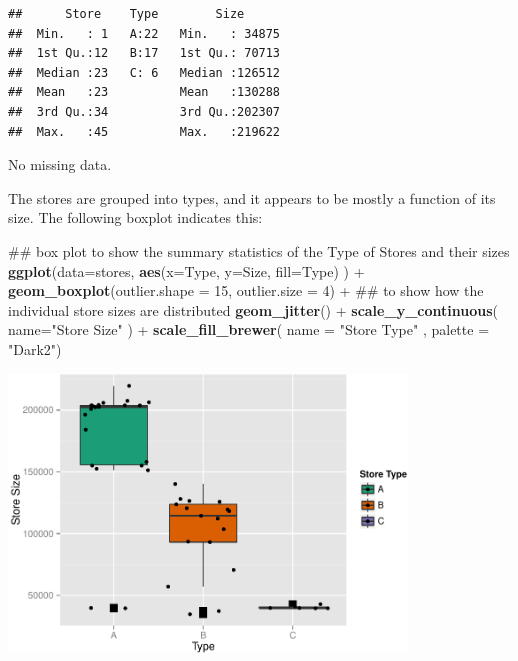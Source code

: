 \documentclass[]{article}
\newenvironment{Shaded}{\begin{snugshade}}{\end{snugshade}}
\newcommand{\KeywordTok}[1]{\textcolor[rgb]{0.13,0.29,0.53}{\textbf{{#1}}}}
\newcommand{\DataTypeTok}[1]{\textcolor[rgb]{0.13,0.29,0.53}{{#1}}}
\newcommand{\DecValTok}[1]{\textcolor[rgb]{0.00,0.00,0.81}{{#1}}}
\newcommand{\StringTok}[1]{\textcolor[rgb]{0.31,0.60,0.02}{{#1}}}
\newcommand{\NormalTok}[1]{{#1}}
\begin{document}
\begin{verbatim}
##      Store    Type        Size       
##  Min.   : 1   A:22   Min.   : 34875  
##  1st Qu.:12   B:17   1st Qu.: 70713  
##  Median :23   C: 6   Median :126512  
##  Mean   :23          Mean   :130288  
##  3rd Qu.:34          3rd Qu.:202307  
##  Max.   :45          Max.   :219622
\end{verbatim}

No missing data.

The stores are grouped into types, and it appears to be mostly a
function of its size. The following boxplot indicates this:

\begin{Shaded}
\begin{Highlighting}[]
\NormalTok{## box plot to show the summary statistics of the Type of Stores and their sizes}
\KeywordTok{ggplot}\NormalTok{(}\DataTypeTok{data=}\NormalTok{stores, }
       \KeywordTok{aes}\NormalTok{(}\DataTypeTok{x=}\NormalTok{Type, }\DataTypeTok{y=}\NormalTok{Size, }\DataTypeTok{fill=}\NormalTok{Type) ) +}\StringTok{ }
\StringTok{  }\KeywordTok{geom_boxplot}\NormalTok{(}\DataTypeTok{outlier.shape =} \DecValTok{15}\NormalTok{, }\DataTypeTok{outlier.size =} \DecValTok{4}\NormalTok{) +}
\StringTok{  }\NormalTok{## to show how the individual store sizes are distributed}
\StringTok{  }\KeywordTok{geom_jitter}\NormalTok{() +}
\StringTok{  }\KeywordTok{scale_y_continuous}\NormalTok{( }\DataTypeTok{name=}\StringTok{"Store Size"} \NormalTok{) +}\StringTok{ }
\StringTok{  }\KeywordTok{scale_fill_brewer}\NormalTok{( }\DataTypeTok{name =} \StringTok{"Store Type"} \NormalTok{, }\DataTypeTok{palette =} \StringTok{"Dark2"}\NormalTok{)}
\end{Highlighting}
\end{Shaded}

\includegraphics[width=400px]{PredictingWeeklySalesAtWalmart_files/figure-latex/storeSizeBoxPlot-1}
\end{document}
